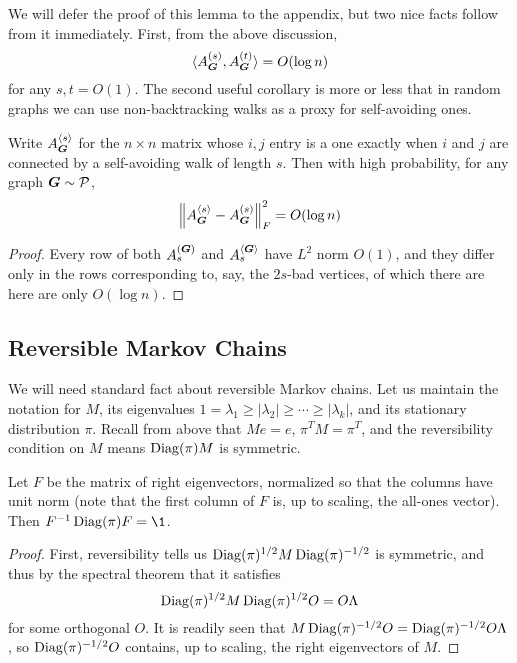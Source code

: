 We will defer the proof of this lemma to the appendix, but two nice facts follow from it immediately. First, from the above discussion,
$$
    \langle A^{(s)}_{\boldsymbol{G}},A^{(t)}_{\boldsymbol{G}} \rangle = O(\log n)
$$
for any $s,t=O(1)$. The second useful corollary is more or less that in random graphs we can use non-backtracking walks as a proxy for self-avoiding ones.

\begin{lemma} \label{lem:sa-nb}
    Write $A^{\langle s \rangle}_{\boldsymbol{G}}$ for the $n\times n$ matrix whose $i,j$ entry is a one exactly when $i$ and $j$ are connected by a self-avoiding walk of length $s$. Then with high probability, for any graph $\boldsymbol{G} \sim \mathcal{P}$,
    \begin{equation}
        \left\| A^{\langle s \rangle}_{\boldsymbol{G}} - A^{(s)}_{\boldsymbol{G}} \right\|_F^2 = O(\log n)
    \end{equation}
\end{lemma}

\begin{proof}
    Every row of both $A^{(\boldsymbol{G})}_{s}$ and $A^{\langle \boldsymbol{G} \rangle}_{s}$ have $L^2$ norm $O(1)$, and they differ only in the rows corresponding to, say, the $2s$-bad vertices, of which there are here are only $O(\log n)$.
\end{proof}

\subsection{Reversible Markov Chains}

We will need standard fact about reversible Markov chains. Let us maintain the notation for $M$, its eigenvalues $1 = \lambda_1 \ge |\lambda_2| \ge \cdots \ge |\lambda_k|$, and its stationary distribution $\pi$. Recall from above that $Me = e$, $\pi^T M = \pi^T$, and the reversibility condition on $M$ means $\operatorname{Diag}(\pi)M$ is symmetric. 

\begin{lemma} \label{lem:markov-ev}
    Let $F$ be the matrix of right eigenvectors, normalized so that the columns have unit norm (note that the first column of $F$ is, up to scaling, the all-ones vector). Then $F^{-1}\Diag(\pi) F = \1$.
\end{lemma}

\begin{proof}
    First, reversibility tells us $\operatorname{Diag}(\pi)^{1/2}M\operatorname{Diag}(\pi)^{-1/2}$ is symmetric, and thus by the spectral theorem that it satisfies 
    $$
        \operatorname{Diag}(\pi)^{1/2}M\operatorname{Diag}(\pi)^{1/2}O = O\Lambda
    $$ 
    for some orthogonal $O$. It is readily seen that $M\operatorname{Diag}(\pi)^{-1/2}O = \operatorname{Diag}(\pi)^{-1/2}O\Lambda$, so $\operatorname{Diag}(\pi)^{-1/2}O$ contains, up to scaling, the right eigenvectors of $M$.
\end{proof}

